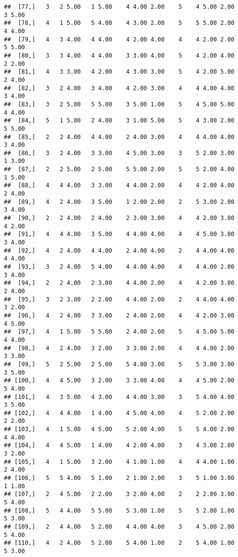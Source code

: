 \documentclass[]{article}
\begin{document}
\begin{verbatim}
##  [77,]   3   2 5.00   1 5.00    4 4.00 2.00    5    4 5.00 2.00    3 5.00
##  [78,]   4   1 5.00   5 4.00    4 3.00 2.00    5    5 5.00 2.00    4 4.00
##  [79,]   4   3 4.00   4 4.00    4 2.00 4.00    4    4 2.00 2.00    5 5.00
##  [80,]   3   3 4.00   4 4.00    3 3.00 4.00    5    4 2.00 4.00    2 2.00
##  [81,]   4   3 3.00   4 2.00    4 3.00 3.00    5    4 2.00 5.00    2 4.00
##  [82,]   3   2 4.00   3 4.00    4 2.00 3.00    4    4 4.00 4.00    3 4.00
##  [83,]   3   2 5.00   5 5.00    3 5.00 1.00    5    4 5.00 5.00    4 4.00
##  [84,]   5   1 5.00   2 4.00    3 1.00 5.00    5    4 3.00 2.00    5 5.00
##  [85,]   2   2 4.00   4 4.00    2 4.00 3.00    4    4 4.00 4.00    3 4.00
##  [86,]   3   2 4.00   3 3.00    4 5.00 3.00    3    5 2.00 3.00    1 3.00
##  [87,]   2   2 5.00   2 5.00    5 5.00 2.00    5    5 2.00 4.00    1 5.00
##  [88,]   4   4 4.00   3 3.00    4 4.00 2.00    4    4 2.00 4.00    2 4.00
##  [89,]   4   2 4.00   3 5.00    1 2.00 2.00    2    5 3.00 2.00    3 4.00
##  [90,]   2   2 4.00   2 4.00    2 3.00 3.00    4    4 2.00 3.00    4 2.00
##  [91,]   4   4 4.00   3 5.00    4 4.00 4.00    4    4 5.00 3.00    3 4.00
##  [92,]   4   2 4.00   4 4.00    2 4.00 4.00    2    4 4.00 4.00    4 4.00
##  [93,]   3   2 4.00   5 4.00    4 4.00 4.00    4    4 4.00 2.00    3 4.00
##  [94,]   2   2 4.00   2 3.00    4 4.00 2.00    4    4 2.00 3.00    2 4.00
##  [95,]   3   2 3.00   2 2.00    4 4.00 2.00    2    4 4.00 4.00    3 2.00
##  [96,]   4   2 4.00   3 3.00    2 4.00 2.00    4    4 2.00 3.00    4 5.00
##  [97,]   4   1 5.00   5 5.00    2 4.00 2.00    5    4 5.00 5.00    4 4.00
##  [98,]   4   2 4.00   3 2.00    3 3.00 2.00    4    4 4.00 2.00    3 3.00
##  [99,]   5   2 5.00   2 5.00    5 4.00 3.00    5    5 3.00 3.00    3 5.00
## [100,]   4   4 5.00   3 2.00    3 3.00 4.00    4    4 5.00 2.00    5 4.00
## [101,]   4   3 5.00   4 3.00    4 4.00 3.00    3    5 4.00 4.00    3 5.00
## [102,]   4   4 4.00   1 4.00    4 5.00 4.00    4    5 2.00 2.00    2 2.00
## [103,]   4   1 5.00   4 5.00    5 2.00 4.00    5    5 4.00 2.00    4 4.00
## [104,]   4   4 5.00   1 4.00    4 2.00 4.00    3    4 3.00 2.00    3 2.00
## [105,]   4   1 5.00   3 2.00    4 1.00 1.00    4    4 4.00 1.00    2 4.00
## [106,]   5   5 4.00   5 1.00    2 1.00 2.00    3    5 1.00 3.00    1 1.00
## [107,]   2   4 5.00   2 2.00    3 2.00 4.00    2    2 2.00 3.00    5 4.00
## [108,]   5   4 4.00   5 5.00    5 3.00 1.00    5    5 2.00 1.00    5 3.00
## [109,]   2   4 4.00   5 2.00    4 4.00 4.00    3    4 5.00 2.00    5 4.00
## [110,]   4   2 4.00   5 2.00    5 4.00 1.00    2    5 4.00 1.00    5 3.00

\end{verbatim}
\end{document}
